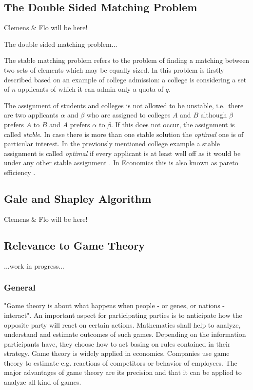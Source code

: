 \subsection{The Double Sided Matching Problem}
Clemens \& Flo will be here!

The double sided matching problem...

The stable matching problem refers to the problem of finding a matching between two sets of elements which may be equally sized.
In \cite[p. 9]{gale62a} this problem is firstly described based on an example of college admission: a college is considering a set of $n$ applicants of which it can admin only a quota of $q$.

The assignment of students and colleges is not allowed to be unstable, i.e.\ there are two applicants $\alpha$ and $\beta$ who are assigned to colleges $A$ and $B$ although $\beta$ prefers $A$ to $B$ and $A$ prefers $\alpha$ to $\beta$.
If this does not occur, the assignment is called \textit{stable}.
In case there is more than one stable solution the \textit{optimal} one is of particular interest.
In the previously mentioned college example a stable assignment is called \textit{optimal} if every applicant is at least well off as it would be under any other stable assignment \cite[p. 10]{gale62a}.
In Economics this is also known as pareto efficiency \cite[p. 46]{9780199297818}.

\subsection{Gale and Shapley Algorithm}
Clemens \& Flo will be here!

\subsection{Relevance to Game Theory}
...work in progress...

\subsubsection{General}
"Game theory is about what happens when people - or genes, or nations - interact".
An important aspect for participating parties is to anticipate how the opposite party will react on certain actions.
Mathematics shall help to analyze, understand and estimate outcomes of such games. Depending on the information participants have, they choose how to act basing on rules contained in their strategy.
Game theory is widely applied in economics.
Companies use game theory to estimate e.g. reactions of competitors or behavior of employees.
The major advantages of game theory are its precision and that it can be applied to analyze all kind of games. \cite[p. 1ff]{camerer2003behavioral}

